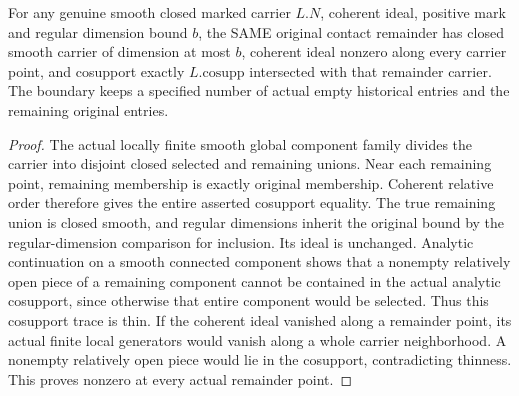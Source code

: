 \begin{theorem}
\label{hir:original-all-level-contact-remainder-nonzero-geometry}
\leanok
{}
For any genuine smooth closed marked carrier $L.N$, coherent ideal, positive
mark and regular dimension bound $b$, the SAME original contact remainder
has closed smooth carrier of dimension at most $b$, coherent ideal nonzero
along every carrier point, and cosupport exactly $L.\mathrm{cosupp}$ intersected
with that remainder carrier. The boundary keeps a specified number of actual
empty historical entries and the remaining original entries.
\end{theorem}
\begin{proof}
The actual locally finite smooth global component family divides the carrier
into disjoint closed selected and remaining unions. Near each remaining point,
remaining membership is exactly original membership. Coherent relative order
therefore gives the entire asserted cosupport equality. The true remaining union
is closed smooth, and regular dimensions inherit the original bound by the
regular-dimension comparison for inclusion. Its ideal is unchanged. Analytic
continuation on a smooth connected component shows that a nonempty relatively
open piece of a remaining component cannot be contained in the actual analytic
cosupport, since otherwise that entire component would be selected. Thus this
cosupport trace is thin. If the coherent ideal vanished along a remainder point,
its actual finite local generators would vanish along a whole carrier
neighborhood. A nonempty relatively open piece would lie in the cosupport,
contradicting thinness. This proves nonzero at every actual remainder point.
\end{proof}

